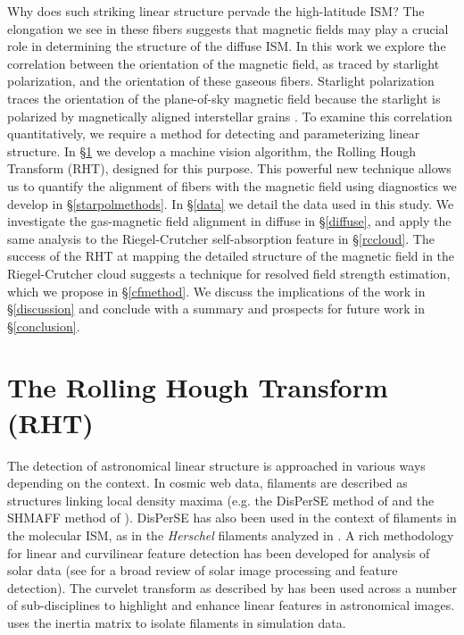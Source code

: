 Why does such striking linear structure pervade the high-latitude ISM? The elongation we see in these fibers suggests that magnetic fields may play a crucial role in determining the structure of the diffuse ISM. In this work we explore the correlation between the orientation of the magnetic field, as traced by starlight polarization, and the orientation of these gaseous fibers. Starlight polarization traces the orientation of the plane-of-sky magnetic field because the starlight is polarized by magnetically aligned interstellar grains \citep{Goldsmith:2008hl}. To examine this correlation quantitatively, we require a method for detecting and parameterizing linear structure. In \S \ref{rht} we develop a machine vision algorithm, the Rolling Hough Transform (RHT), designed for this purpose. This powerful new technique allows us to quantify the alignment of \hi fibers with the magnetic field using diagnostics we develop in \S\ref{starpolmethods}. In \S\ref{data} we detail the data used in this study. We investigate the gas-magnetic field alignment in diffuse \hi in \S\ref{diffuse}, and apply the same analysis to the Riegel-Crutcher \hi self-absorption feature in \S\ref{rccloud}. The success of the RHT at mapping the detailed structure of the magnetic field in the Riegel-Crutcher cloud suggests a technique for resolved field strength estimation, which we propose in \S\ref{cfmethod}. We discuss the implications of the work in \S \ref{discussion} and conclude with a summary and prospects for future work in \S \ref{conclusion}.

\section{The Rolling Hough Transform (RHT)} \label{rht}

The detection of astronomical linear structure is approached in various ways depending on the context. In cosmic web data, filaments are described as structures linking local density maxima (e.g. the DisPerSE method of \citet{Sousbie:2011ft} and the SHMAFF method of \citet{2010MNRAS.409..156B}). DisPerSE has also been used in the context of filaments in the molecular ISM, as in the \emph{Herschel} filaments analyzed in \cite{Arzoumanian:2011wu}. A rich methodology for linear and curvilinear feature detection has been developed for analysis of solar data (see \citet{Aschwanden:2009gk} for a broad review of solar image processing and feature detection). The curvelet transform as described by \citet{Starck:2003wx} has been used across a number of sub-disciplines to highlight and enhance linear features in astronomical images. \citet{Hennebelle:2013ws} uses the inertia matrix to isolate filaments in simulation data.


